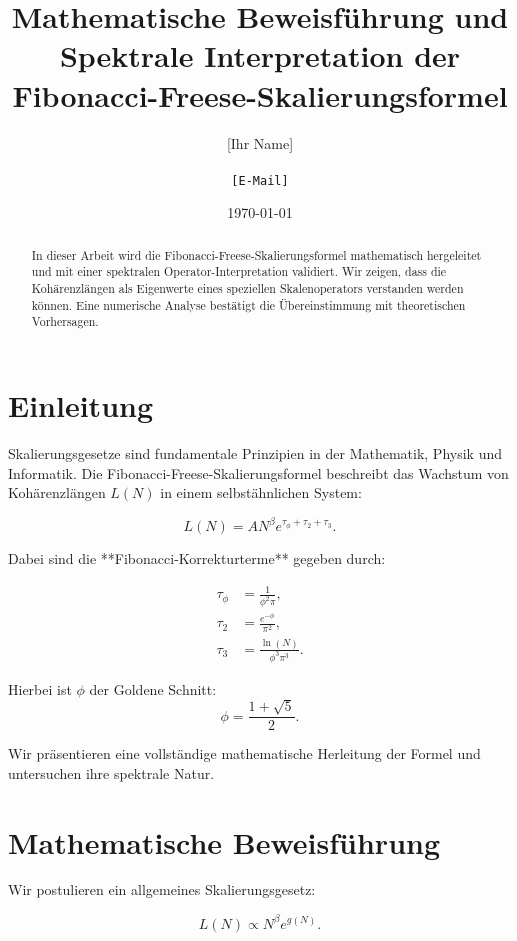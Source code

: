 \documentclass[a4paper,12pt]{article}
\title{Mathematische Beweisführung und Spektrale Interpretation der Fibonacci-Freese-Skalierungsformel}
\author{[Ihr Name] \\ [Institution] \\ \texttt{[E-Mail]}}
\date{\today}
\begin{document}
\maketitle

\begin{abstract}
In dieser Arbeit wird die Fibonacci-Freese-Skalierungsformel mathematisch hergeleitet und mit einer spektralen Operator-Interpretation validiert. Wir zeigen, dass die Kohärenzlängen als Eigenwerte eines speziellen Skalenoperators verstanden werden können. Eine numerische Analyse bestätigt die Übereinstimmung mit theoretischen Vorhersagen.
\end{abstract}

\section{Einleitung}
Skalierungsgesetze sind fundamentale Prinzipien in der Mathematik, Physik und Informatik. Die Fibonacci-Freese-Skalierungsformel beschreibt das Wachstum von Kohärenzlängen \( L(N) \) in einem selbstähnlichen System:

\begin{equation}
    L(N) = A N^\beta e^{\tau_{\phi} + \tau_2 + \tau_3}.
\end{equation}

Dabei sind die **Fibonacci-Korrekturterme** gegeben durch:

\begin{align}
    \tau_{\phi} &= \frac{1}{\phi^2 \pi}, \\
    \tau_2 &= \frac{e^{-\phi}}{\pi^2}, \\
    \tau_3 &= \frac{\ln(N)}{\phi^3 \pi^3}.
\end{align}

Hierbei ist \( \phi \) der Goldene Schnitt:
\begin{equation}
    \phi = \frac{1+\sqrt{5}}{2}.
\end{equation}

Wir präsentieren eine vollständige mathematische Herleitung der Formel und untersuchen ihre spektrale Natur.

\section{Mathematische Beweisführung}
Wir postulieren ein allgemeines Skalierungsgesetz:

\begin{equation}
    L(N) \propto N^\beta e^{g(N)}.
\end{equation}
\end{document}
